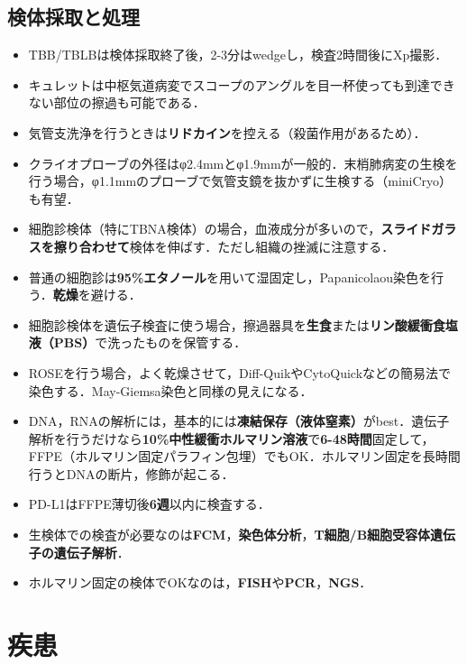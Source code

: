 \subsection{検体採取と処理}
\begin{itemize}

\item TBB/TBLBは検体採取終了後，2-3分はwedgeし，検査2時間後にXp撮影．
\item キュレットは中枢気道病変でスコープのアングルを目一杯使っても到達できない部位の擦過も可能である．
\item 気管支洗浄を行うときは\textbf{リドカイン}を控える（殺菌作用があるため）．
\item クライオプローブの外径はφ2.4mmとφ1.9mmが一般的．末梢肺病変の生検を行う場合，φ1.1mmのプローブで気管支鏡を抜かずに生検する（miniCryo）も有望．
\item 細胞診検体（特にTBNA検体）の場合，血液成分が多いので，\textbf{スライドガラスを擦り合わせて}検体を伸ばす．ただし組織の挫滅に注意する．
\item 普通の細胞診は\textbf{95\%エタノール}を用いて湿固定し，Papanicolaou染色を行う．\textbf{乾燥}を避ける．
\item 細胞診検体を遺伝子検査に使う場合，擦過器具を\textbf{生食}または\textbf{リン酸緩衝食塩液（PBS）}で洗ったものを保管する．
\item ROSEを行う場合，よく乾燥させて，Diff-QuikやCytoQuickなどの簡易法で染色する．May-Giemsa染色と同様の見えになる．
\item DNA，RNAの解析には，基本的には\textbf{凍結保存（液体窒素）}がbest．遺伝子解析を行うだけなら\textbf{10\%中性緩衝ホルマリン溶液}で\textbf{6-48時間}固定して，FFPE（ホルマリン固定パラフィン包埋）でもOK．ホルマリン固定を長時間行うとDNAの断片，修飾が起こる．
\item PD-L1はFFPE薄切後\textbf{6週}以内に検査する．
\item 生検体での検査が必要なのは\textbf{FCM}，\textbf{染色体分析}，\textbf{T細胞/B細胞受容体遺伝子の遺伝子解析}．
\item ホルマリン固定の検体でOKなのは，\textbf{FISH}や\textbf{PCR}，\textbf{NGS}．



\end{itemize}
\newpage


\section{疾患}
